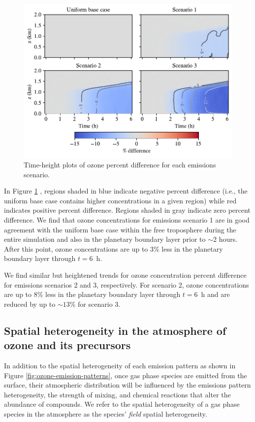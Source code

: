 \begin{figure}[h]
  \centering
    \includegraphics[width=\textwidth]{figures/chapter4/height-time-o3-pdiff-four-scenarios.pdf}
    \caption{Time-height plots of ozone percent difference for each emissions scenario.}
    \label{fig:ht-pdiff-o3}
\end{figure}

In Figure \ref{fig:ht-pdiff-o3} , regions shaded in blue indicate negative percent difference (i.e., the uniform base case contains higher concentrations in a given region) while red indicates positive percent difference. Regions shaded in gray indicate zero percent difference. We find that ozone concentrations for emissions scenario 1 are in good agreement with the uniform base case within the free troposphere during the entire simulation and also in the planetary boundary layer prior to $\sim$2 hours. After this point, ozone concentrations are up to 3\% less in the planetary boundary layer through $t=6$~h.

We find similar but heightened trends for ozone concentration percent difference for emissions scenarios 2 and 3, respectively. For scenario 2, ozone concentrations are up to 8\% less in the planetary boundary layer through $t=6$~h and are reduced by up to $\sim13$\% for scenario 3.

\subsection{Spatial heterogeneity in the atmosphere of ozone and its precursors}

In addition to the spatial heterogeneity of each emission pattern as shown in Figure \ref{fig:ozone-emission-patterns}, once gas phase species are emitted from the surface, their atmospheric distribution will be influenced by the emissions pattern heterogeneity, the strength of mixing, and chemical reactions that alter the abundance of compounds. We refer to the spatial heterogeneity of a gas phase species in the atmosphere as the species' {\it field} spatial heterogeneity. 


